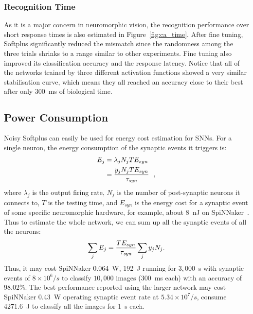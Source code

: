 	\subsubsection{Recognition Time}
	As it is a major concern in neuromorphic vision, the recognition performance over short response times is also estimated in Figure~\ref{fig:ca_time}.
	After fine tuning, Softplus significantly reduced the mismatch since the randomness among the three trials shrinks to a range similar to other experiments.
	Fine tuning also improved its classification accuracy and the response latency.
	Notice that all of the networks trained by three different activation functions showed a very similar stabilisation curve, which means they all reached an accuracy close to their best after only 300~ms of biological time. 

	
	\subsection{Power Consumption}
	\label{subsec:result_power}
	Noisy Softplus can easily be used for energy cost estimation for SNNs.
	For a single neuron, the energy consumption of the synaptic events it triggers is:
	\begin{equation}
	\begin{aligned}
	E_{j} &= \lambda_j N_j T E_{syn}\\
	&= \dfrac{y_j N_j T E_{syn}}{\tau_{\textit{\textrm{syn}}}}~~,
	\end{aligned}
	\label{equ:energy}
	\end{equation}
	where $\lambda_j$ is the output firing rate, $N_j$ is the number of post-synaptic neurons it connects to, $T$ is the testing time, and $E_{syn}$ is the energy cost for a synaptic event of some specific neuromorphic hardware, for example, about 8~nJ on SpiNNaker~\citep{stromatias2013power}.
	Thus to estimate the whole network, we can sum up all the synaptic events of all the neurons:
	\begin{equation}
	\sum_j E_{j} =  \dfrac{T E_{syn}}{\tau_{\textit{\textrm{syn}}}} \sum_{j}y_j N_j.
	\end{equation}
	Thus, it may cost SpiNNaker 0.064~W, 192~J running for $3,000$~s with synaptic events of $8\times10^6/s$ to classify $10,000$ images (300~ms each) with an accuracy of 98.02\%.
	The best performance reported using the larger network may cost SpiNNaker 0.43~W operating synaptic event rate at $5.34\times10^7/s$, consume 4271.6~J to classify all the images for 1~s each.

